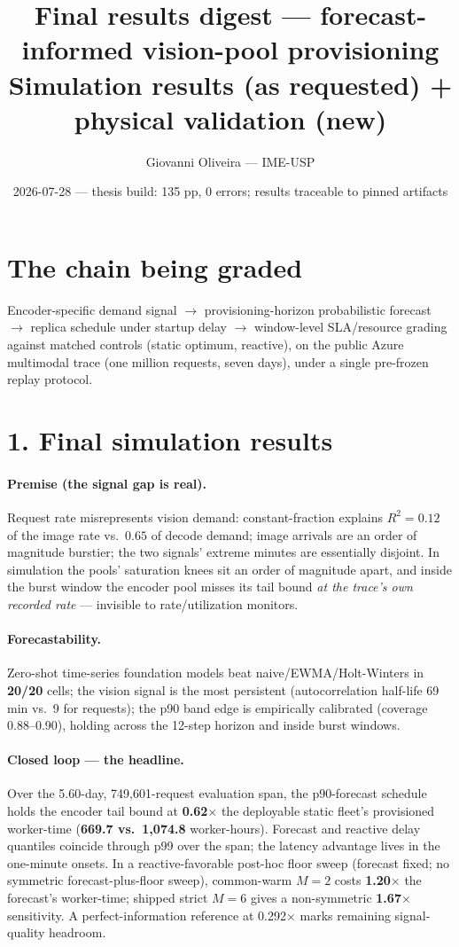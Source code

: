 \documentclass[11pt,a4paper]{article}
\title{\vspace{-1.2em}Final results digest --- forecast-informed vision-pool provisioning\\
\large Simulation results (as requested) + physical validation (new)}
\author{Giovanni Oliveira --- IME-USP}
\date{2026-07-28 --- thesis build: 135 pp, 0 errors; results traceable to pinned artifacts}
\begin{document}
\maketitle
\vspace{-2.2em}

\section*{The chain being graded}
Encoder-specific demand signal $\to$ provisioning-horizon probabilistic
forecast $\to$ replica schedule under startup delay $\to$ window-level
SLA/resource grading against matched controls (static optimum, reactive),
on the public Azure multimodal trace (one million requests, seven days),
under a single pre-frozen replay protocol.

\section*{1. Final simulation results}

\paragraph{Premise (the signal gap is real).} Request rate misrepresents
vision demand: constant-fraction explains $R^2{=}0.12$ of the image rate
vs.\ $0.65$ of decode demand; image arrivals are an order of magnitude
burstier; the two signals' extreme minutes are essentially disjoint. In
simulation the pools' saturation knees sit an order of magnitude apart,
and inside the burst window the encoder pool misses its tail bound
\emph{at the trace's own recorded rate} --- invisible to rate/utilization
monitors.

\paragraph{Forecastability.} Zero-shot time-series foundation models beat
naive/EWMA/Holt-Winters in \textbf{20/20} cells; the vision signal is the
most persistent (autocorrelation half-life 69 min vs.\ 9 for requests);
the p90 band edge is empirically calibrated (coverage 0.88--0.90), holding
across the 12-step horizon and inside burst windows.

\paragraph{Closed loop --- the headline.} Over the 5.60-day,
749{,}601-request evaluation span, the p90-forecast schedule holds the
encoder tail bound at \textbf{0.62$\times$} the deployable static fleet's
provisioned worker-time (\textbf{669.7 vs.\ 1{,}074.8} worker-hours).
Forecast and reactive delay quantiles coincide through p99 over the span;
the latency advantage lives in the one-minute onsets. In a
reactive-favorable post-hoc floor sweep (forecast fixed; no symmetric
forecast-plus-floor sweep), common-warm $M{=}2$ costs
\textbf{1.20$\times$} the forecast's worker-time; shipped strict
$M{=}6$ gives a non-symmetric \textbf{1.67$\times$} sensitivity. A
perfect-information reference at 0.292$\times$ marks remaining
signal-quality headroom.
\end{document}
